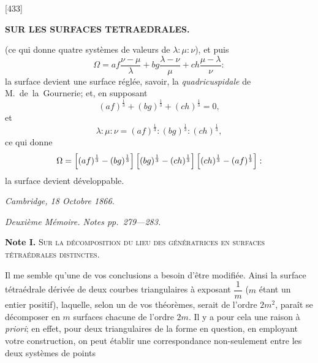 \documentclass[12pt,a4paper]{article}
\newcommand{\paperref}[1]{\textup{[#1]}}
\theoremstyle{definition}
\begin{document}
\setcounter{page}{51}


\noindent\paperref{433}\quad
\begin{center}
\textbf{SUR LES SURFACES TETRAEDRALES.}
\end{center}

\noindent
(ce qui donne quatre syst\`emes de valeurs de $\lambda : \mu : \nu$), et puis
\[
\Omega = af\frac{\nu - \mu}{\lambda} + bg\frac{\lambda - \nu}{\mu} + ch\frac{\mu - \lambda}{\nu}:
\]
la surface devient une surface r\'egl\'ee, savoir, la \textit{quadricuspidale} de M.~de~la~Gournerie; et, en supposant
\[
(af)^{\frac{1}{3}} + (bg)^{\frac{1}{3}} + (ch)^{\frac{1}{3}} = 0,
\]
et
\[
\lambda : \mu : \nu = (af)^{\frac{1}{3}} : (bg)^{\frac{1}{3}} : (ch)^{\frac{1}{3}},
\]
ce qui donne
\[
\Omega = \Bigl[(af)^{\frac{1}{3}} - (bg)^{\frac{1}{3}}\Bigr]\,
\Bigl[(bg)^{\frac{1}{3}} - (ch)^{\frac{1}{3}}\Bigr]\,
\Bigl[(ch)^{\frac{1}{3}} - (af)^{\frac{1}{3}}\Bigr]:
\]
la surface devient d\'eveloppable.

\begin{flushright}
\textit{Cambridge, 18 Octobre 1866.}
\end{flushright}

\begin{center}
\textit{Deuxi\`eme M\'emoire. Notes pp.~279---283.}
\end{center}

\smallskip\noindent
\textbf{Note I.}\quad
\textsc{Sur la d\'ecomposition du lieu des g\'en\'eratrices en surfaces t\'etra\'edrales distinctes.}

\smallskip
Il me semble qu'une de vos conclusions a besoin d'\^etre modifi\'ee. Ainsi la surface t\'etra\'edrale d\'eriv\'ee de deux courbes triangulaires \`a exposant $\dfrac{1}{m}$ ($m$ \'etant un entier positif), laquelle, selon un de vos th\'eor\`emes, serait de l'ordre $2m^2$, para\^it se d\'ecomposer en $m$ surfaces chacune de l'ordre $2m$. Il y a pour cela une raison \`a \textit{priori}; en effet, pour deux triangulaires de la forme en question, en employant votre construction, on peut \'etablir une correspondance non-seulement entre les deux syst\`emes de points

\end{document}
